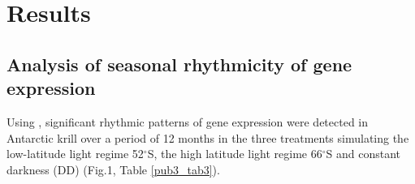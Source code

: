 
\section{Results}

\subsection{Analysis of seasonal rhythmicity of gene expression}

Using , significant rhythmic patterns of gene expression were
detected in Antarctic krill over a period of 12 months in the three treatments
simulating the low-latitude light regime 52$^{\circ}$S, the high latitude light
regime 66$^{\circ}$S and constant darkness (DD) (Fig.1, Table \ref{pub3_tab3}).

